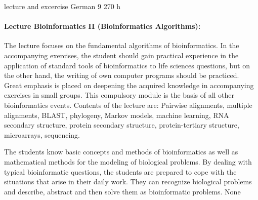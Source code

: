 {lecture and excercise}
{German}
{9}
{270 h}
{\paragraph{Lecture Bioinformatics II (Bioinformatics Algorithms): } 
The lecture focuses on the fundamental algorithms of bioinformatics. In the accompanying exercises, the student should gain practical experience in the application of standard tools of bioinformatics to life sciences questions, but on the other hand, the writing of own computer programs should be practiced. Great emphasis is placed on deepening the acquired knowledge in accompanying exercises in small groups. This compulsory module is the basis of all other bioinformatics events. Contents of the lecture are: Pairwise alignments, multiple alignments, BLAST, phylogeny, Markov models, machine learning, RNA secondary structure, protein secondary structure, protein-tertiary structure, microarrays, sequencing.
} 
{The students know basic concepts and methods of bioinformatics as well as mathematical methods for the modeling of biological problems. By dealing with typical bioinformatic questions, the students are prepared to cope with the situations that arise in their daily work. They can recognize biological problems and describe, abstract and then solve them as bioinformatic problems.
}
{None}